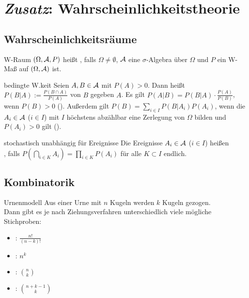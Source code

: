 \chapter{%
    \emph{Zusatz}: Wahrscheinlichkeitstheorie%
}

\section{%
    Wahrscheinlichkeitsräume%
}

\begin{Def}{W-Raum}
    $(\Omega, \mathcal{A}, P)$ heißt , falls
    $\Omega \not= \emptyset$,
    $\mathcal{A}$ eine $\sigma$-Algebra über $\Omega$ und
    $P$ ein W-Maß auf $(\Omega, \mathcal{A})$ ist.
\end{Def}

\begin{Def}{bedingte W.keit}
    Seien $A, B \in \mathcal{A}$ mit $P(A) > 0$.
    Dann heißt $P(B|A) := \frac{P(B \cap A)}{P(A)}$  von
    $B$ gegeben $A$.
    Es gilt $P(A|B) = P(B|A) \cdot \frac{P(A)}{P(B)}$, wenn $P(B) > 0$
    ().
    Außerdem gilt $P(B) = \sum_{i \in I} P(B|A_i) P(A_i)$, wenn die $A_i \in \mathcal{A}$ ($i \in I$) mit
    $I$ höchstens abzählbar eine Zerlegung von $\Omega$ bilden und $P(A_i) > 0$ gilt
    ().
\end{Def}

\begin{Def}{stochastisch unabhängig für Ereignisse}
    Die Ereignisse $A_i \in \mathcal{A}$ ($i \in I$) heißen\\
    ,
    falls $P(\bigcap_{i \in K} A_i) = \prod_{i \in K} P(A_i)$ für alle $K \subset I$ endlich.
\end{Def}

\section{%
    Kombinatorik%
}

\begin{Def}{Urnenmodell}
    Aus einer Urne mit $n$ Kugeln werden $k$ Kugeln gezogen.\\
    Dann gibt es je nach Ziehungsverfahren unterschiedlich viele mögliche Stichproben:
    \begin{itemize}
        \item
        :
        $\frac{n!}{(n - k)!}$

        \item
        :
        $n^k$

        \item
        :
        $\binom{n}{k}$

        \item
        :
        $\binom{n + k - 1}{k}$
    \end{itemize}
\end{Def}

